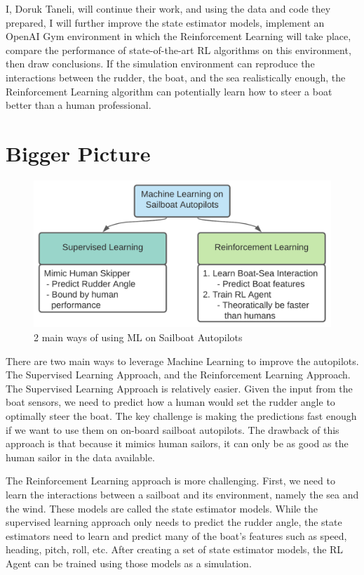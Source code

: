 \documentclass[12pt,twoside]{report}
\begin{document}
I, Doruk Taneli, will continue their work, and using the data and code they prepared, I will further improve the state estimator models, implement an OpenAI Gym environment in which the Reinforcement Learning will take place, compare the performance of state-of-the-art RL algorithms on this environment, then draw conclusions. If the simulation environment can reproduce the interactions between the rudder, the boat, and the sea realistically enough, the Reinforcement Learning algorithm can potentially learn how to steer a boat better than a human professional.

\section{Bigger Picture}

\begin{figure}[h]
\centering
\includegraphics[width = 0.8\hsize]{figures/other/ML on autopilots.png}
\caption{2 main ways of using ML on Sailboat Autopilots}
\label{fig:ml-on-autopilot}
\end{figure}

There are two main ways to leverage Machine Learning to improve the autopilots. The Supervised Learning Approach, and the Reinforcement Learning Approach. The Supervised Learning Approach is relatively easier. Given the input from the boat sensors, we need to predict how a human would set the rudder angle to optimally steer the boat. The key challenge is making the predictions fast enough if we want to use them on on-board sailboat autopilots. The drawback of this approach is that because it mimics human sailors, it can only be as good as the human sailor in the data available.

The Reinforcement Learning approach is more challenging. First, we need to learn the interactions between a sailboat and its environment, namely the sea and the wind. These models are called the state estimator models. While the supervised learning approach only needs to predict the rudder angle, the state estimators need to learn and predict many of the boat's features such as speed, heading, pitch, roll, etc. After creating a set of state estimator models, the RL Agent can be trained using those models as a simulation.
\end{document}

